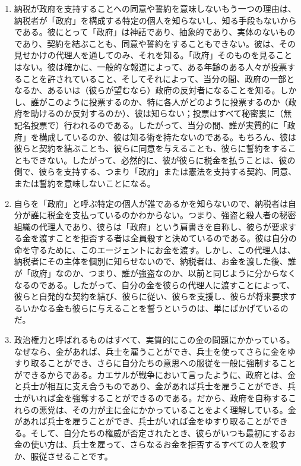 \documentclass[dvipdfmx, uplatex, tate, landscape]{utbook}
\begin{document}
\begin{enumerate}
\item 納税が政府を支持することへの同意や誓約を意味しないもう一つの理由は、納税者が「政府」を構成する特定の個人を知らないし、知る手段もないからである。彼にとって「政府」は神話であり、抽象的であり、実体のないものであり、契約を結ぶことも、同意や誓約をすることもできない。彼は、その見せかけの代理人を通してのみ、それを知る。「政府」そのものを見ることはない。彼は確かに、一般的な報道によって、ある年齢のある人々が投票することを許されていること、そしてそれによって、当分の間、政府の一部となるか、あるいは（彼らが望むなら）政府の反対者になることを知る。しかし、誰がこのように投票するのか、特に各人がどのように投票するのか（政府を助けるのか反対するのか）、彼は知らない；投票はすべて秘密裏に（無記名投票で）行われるのである。したがって、当分の間、誰が実質的に「政府」を構成しているのか、彼は知る術を持たないのである。もちろん、彼は彼らと契約を結ぶことも、彼らに同意を与えることも、彼らに誓約をすることもできない。したがって、必然的に、彼が彼らに税金を払うことは、彼の側で、彼らを支持する、つまり「政府」または憲法を支持する契約、同意、または誓約を意味しないことになる。

\item 自らを「政府」と呼ぶ特定の個人が誰であるかを知らないので、納税者は自分が誰に税金を支払っているのかわからない。つまり、強盗と殺人者の秘密組織の代理人であり、彼らは「政府」という肩書きを自称し、彼らが要求する金を渡すことを拒否する者は全員殺すと決めているのである。彼は自分の命を守るために、このエージェントにお金を渡す。しかし、この代理人は、納税者にその主体を個別に知らせないので、納税者は、お金を渡した後、誰が「政府」なのか、つまり、誰が強盗なのか、以前と同じように分からなくなるのである。したがって、自分の金を彼らの代理人に渡すことによって、彼らと自発的な契約を結び、彼らに従い、彼らを支援し、彼らが将来要求するいかなる金も彼らに与えることを誓うというのは、単にばかげているのだ。

\item 政治権力と呼ばれるものはすべて、実質的にこの金の問題にかかっている。なぜなら、金があれば、兵士を雇うことができ、兵士を使ってさらに金をゆすり取ることができ、さらに自分たちの意思への服従を一般に強制することができるからである。カエサルが戦争において言ったように、政府とは、金と兵士が相互に支え合うものであり、金があれば兵士を雇うことができ、兵士がいれば金を強奪することができるのである。だから、政府を自称するこれらの悪党は、その力が主に金にかかっていることをよく理解している。金があれば兵士を雇うことができ、兵士がいれば金をゆすり取ることができる。そして、自分たちの権威が否定されたとき、彼らがいつも最初にするお金の使い方は、兵士を雇って、さらなるお金を拒否するすべての人を殺すか、服従させることです。
\end{enumerate}
\end{document}
